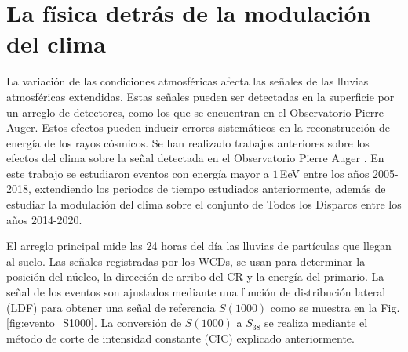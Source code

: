 
\section{La física detrás de la modulación del clima}\label{seccion:fisica_clima}

La variación de las condiciones atmosféricas afecta las señales de las lluvias atmosféricas extendidas. Estas señales pueden ser detectadas en la superficie por un arreglo de detectores, como los que se encuentran en el Observatorio Pierre Auger. Estos efectos pueden inducir errores sistemáticos en la reconstrucción de energía de los rayos cósmicos. Se han realizado  trabajos anteriores sobre los efectos del clima sobre la señal detectada en el Observatorio Pierre Auger \cite{aab2017impact} \cite{collaboration2009atmospheric} . En este trabajo se estudiaron eventos con energía mayor a $1\,$EeV entre los años 2005-2018, extendiendo los periodos de tiempo estudiados anteriormente, además de estudiar la modulación del clima sobre el conjunto  de Todos los Disparos entre los años 2014-2020.


El arreglo principal mide las 24 horas del día las lluvias de partículas que llegan al suelo. Las señales registradas por los WCDs, se usan para determinar la posición del núcleo, la dirección de arribo del CR y la energía del primario. La señal de los eventos son ajustados mediante una función de distribución lateral (LDF) para obtener una señal de referencia $S(1000)$ como se muestra en la Fig.\ref{fig:evento_S1000}.
La conversión de $S(1000)$ a $S_{38}$ se realiza mediante el método de corte de intensidad constante (CIC) explicado anteriormente.%

